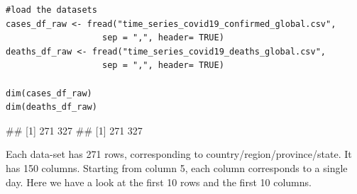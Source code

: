 \begin{verbatim}
#load the datasets
cases_df_raw <- fread("time_series_covid19_confirmed_global.csv", 
                   sep = ",", header= TRUE)
deaths_df_raw <- fread("time_series_covid19_deaths_global.csv", 
                   sep = ",", header= TRUE)
                   
dim(cases_df_raw)
dim(deaths_df_raw)
\end{verbatim}

## [1] 271 327 \newline
## [1] 271 327

Each data-set has 271 rows, corresponding to country/region/province/state. It has 150 columns. Starting
from column 5, each column corresponds to a single day. Here we have a look at the first 10 rows and the
first 10 columns.
\\
\\

